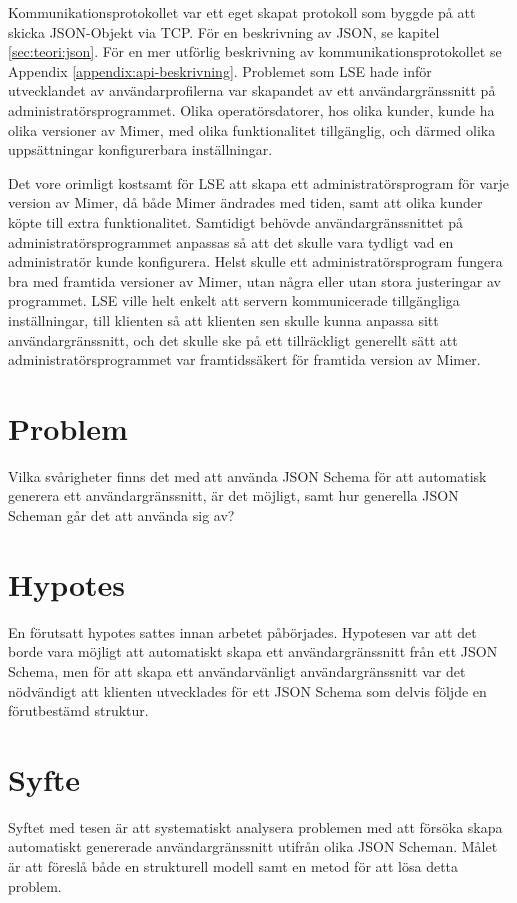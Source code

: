 Kommunikationsprotokollet var ett eget skapat protokoll som byggde på att skicka JSON-Objekt via TCP. För en beskrivning av JSON, se kapitel \ref{sec:teori:json}. För en mer utförlig beskrivning av kommunikationsprotokollet se Appendix \ref{appendix:api-beskrivning}. Problemet som LSE hade inför utvecklandet av användarprofilerna var skapandet av ett användargränssnitt på administratörsprogrammet. Olika operatörsdatorer, hos olika kunder, kunde ha olika versioner av Mimer, med olika funktionalitet tillgänglig, och därmed olika uppsättningar konfigurerbara inställningar. 

Det vore orimligt kostsamt för LSE att skapa ett administratörsprogram för varje version av Mimer, då både Mimer ändrades med tiden, samt att olika kunder köpte till extra funktionalitet. Samtidigt behövde användargränssnittet på administratörsprogrammet anpassas så att det skulle vara tydligt vad en administratör kunde konfigurera. Helst skulle ett administratörsprogram fungera bra med framtida versioner av Mimer, utan några eller utan stora justeringar av programmet. LSE ville helt enkelt att servern kommunicerade tillgängliga inställningar, till klienten så att klienten sen skulle kunna anpassa sitt användargränssnitt, och det skulle ske på ett tillräckligt generellt sätt att administratörsprogrammet var framtidssäkert för framtida version av Mimer.

\section{Problem}
\label{sec:intro:problem}
Vilka svårigheter finns det med att använda JSON Schema för att automatisk generera ett användargränssnitt, är det möjligt, samt hur generella JSON Scheman går det att använda sig av?

\section{Hypotes}
\label{sec:intro:hypotes}
En förutsatt hypotes sattes innan arbetet påbörjades. Hypotesen var att det borde vara möjligt att automatiskt skapa ett användargränssnitt från ett JSON Schema, men för att skapa ett användarvänligt användargränssnitt var det nödvändigt att klienten utvecklades för ett JSON Schema som delvis följde en förutbestämd struktur.

\section{Syfte}
\label{sec:intro:syfte}
Syftet med tesen är att systematiskt analysera problemen med att försöka skapa automatiskt genererade användargränssnitt utifrån olika JSON Scheman. Målet är att föreslå både en strukturell modell samt en metod för att lösa detta problem.

